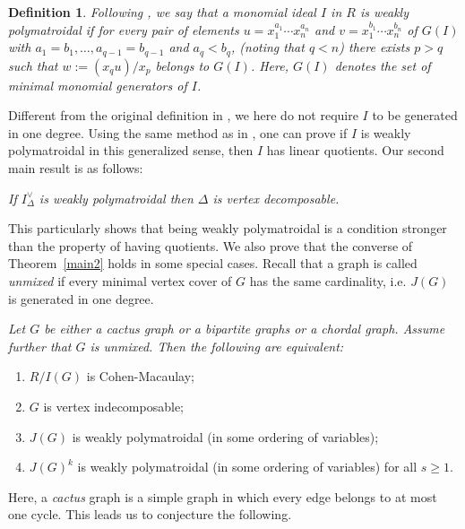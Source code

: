 \documentclass[12pt]{amsart}
\newtheorem{Definition}[Theorem]{Definition}
\begin{document}
\begin{Definition} \em Following \cite{KH}, we say that a monomial ideal $I$ in $R$  is {\it weakly polymatroidal} if for every pair of elements $u=x_1^{a_1}\cdots x_n^{a_n}$ and $v=x_1^{b_1}\cdots x_n^{b_n}$ of $G(I)$ with $a_1=b_1,\ldots,a_{q-1}=b_{q-1}$ and $a_q<b_q$, (noting that $q<n$) there exists $p>q$
such that $w:=(x_qu)/x_p$ belongs to $G(I)$. Here, $G(I)$ denotes the set of minimal monomial generators of $I$.
 \end{Definition} Different from  the original definition in \cite{KH}, we here do not require $I$ to be generated in one degree. Using the same method as in \cite{KH}, one can prove if $I$ is weakly polymatroidal  in this generalized sense, then $I$ has linear quotients.
Our second main result is as follows:


\vspace{1.5mm}
 {\it If $I_{\Delta}^{\vee}$ is  weakly polymatroidal   then $\Delta$ is vertex decomposable.}
\vspace{1.5mm}

 This particularly shows that being weakly  polymatroidal  is a condition stronger than the property of having quotients. We also prove that the converse of  Theorem~\ref{main2} holds in some special cases. Recall that a graph is called {\it unmixed} if every minimal vertex cover of $G$ has the same cardinality, i.e. $J(G)$ is generated in one degree.

\vspace{1.5mm}
 {\it  Let $G$ be either a cactus graph or a bipartite graphs or  a chordal graph. Assume further that $G$ is unmixed. Then the following are equivalent:

\begin{enumerate}
  \item $R/I(G)$ is Cohen-Macaulay;
  \item $G$ is vertex indecomposable;
  \item $J(G)$ is weakly polymatroidal (in some ordering  of variables);
   \item $J(G)^k$ is weakly polymatroidal (in some ordering  of variables) for all $s\geq 1$.
\end{enumerate}
 }
\vspace{1.5mm}

 Here, a {\it cactus} graph is a simple graph in which every edge  belongs to at most one cycle. This leads us to conjecture the following.
\end{document}
